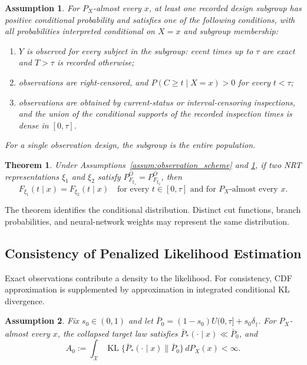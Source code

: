 \documentclass[11pt]{article}
\numberwithin{equation}{section}
\newtheorem{myTheo}{Theorem}
\newtheorem{assum}{Assumption}
\begin{document}
\begin{assum}
\label{assum:identifying_support}
For $P_X$-almost every $x$, at least one recorded design subgroup has positive conditional probability and satisfies one of the following conditions, with all probabilities interpreted conditional on $X=x$ and subgroup membership:
\begin{enumerate}
    \item $Y$ is observed for every subject in the subgroup: event times up to $\tau$ are exact and $T>\tau$ is recorded otherwise;
    \item observations are right-censored, and $P(C\geq t\mid X=x)>0$ for every $t<\tau$;
    \item observations are obtained by current-status or interval-censoring inspections, and the union of the conditional supports of the recorded inspection times is dense in $[0,\tau]$.
\end{enumerate}
For a single observation design, the subgroup is the entire population.
\end{assum}

\begin{myTheo}
\label{thm:nrt_identifiability}
Under Assumptions~\ref{assum:observation_scheme} and \ref{assum:identifying_support}, if two NRT representations $\xi_1$ and $\xi_2$ satisfy $P_{F_{\xi_1}}^O=P_{F_{\xi_2}}^O$, then
\[
    F_{\xi_1}(t\mid x)=F_{\xi_2}(t\mid x)
    \quad\text{for every }t\in[0,\tau]
    \text{ and for }P_X\text{-almost every }x.
\]
\end{myTheo}

The theorem identifies the conditional distribution. Distinct cut functions, branch probabilities, and neural-network weights may represent the same distribution.

\subsection{Consistency of Penalized Likelihood Estimation}

Exact observations contribute a density to the likelihood. For consistency, CDF approximation is supplemented by approximation in integrated conditional KL divergence.

\begin{assum}
\label{assum:regular_target_density}
Fix $s_0\in(0,1)$ and let $\bar P_0=(1-s_0)U(0,\tau]+s_0\delta_\dagger$. For $P_X$-almost every $x$, the collapsed target law satisfies $\bar P_*(\cdot\mid x)\ll\bar P_0$, and
\begin{equation}
    A_0:=\int_{\mathcal X}\operatorname{KL}
       \{\bar P_*(\cdot\mid x)\|\bar P_0\}\,dP_X(x)<\infty.
    \label{eq:target-finite-kl}
\end{equation}
\end{assum}
\end{document}
